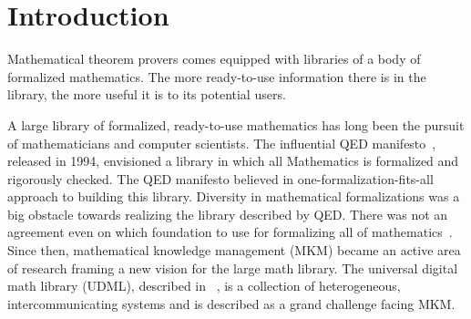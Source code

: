 \chapter{Introduction}


Mathematical theorem provers comes equipped with libraries of a body of formalized mathematics. The more ready-to-use information there is in the library, the more useful it is to its potential users. %
  
A large library of formalized, ready-to-use mathematics has long been the pursuit of mathematicians and computer scientists.  
The influential QED manifesto~\cite{boyer1994qed}, released in 1994, envisioned a library in which all Mathematics is formalized and rigorously checked. The QED manifesto believed in one-formalization-fits-all approach to building this library.
Diversity in mathematical formalizations was a big obstacle towards realizing the library described by QED. There was not an agreement even on which foundation to use for formalizing all of mathematics~\cite{qedrealoaded2016}.  Since then, mathematical knowledge management (MKM) became an active area of research framing a new vision for the large math library. The universal digital math library (UDML), described in ~\cite{farmer2004mkm}, is a collection of heterogeneous, intercommunicating systems and is described as a grand challenge facing MKM. 

